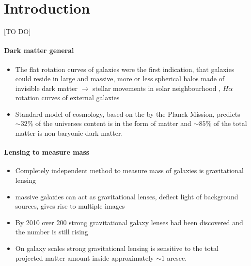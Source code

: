 \section{Introduction}

[TO DO]

\paragraph{Dark matter general}
\begin{itemize}
\item The flat rotation curves of galaxies were the first indication, that galaxies could reside in large and massive, more or less spherical halos made of invisible dark matter $\longrightarrow$ stellar movements in solar neighbourhood \citep{1932BAN.....6..249O}, $H\alpha$ rotation curves of external galaxies \citep{1978ApJ...225L.107R}
\item Standard model of cosmology, based on the by the Planck Mission, predicts $\sim32\%$ of the universes content is in the form of matter and $\sim 85\%$ of the total matter is non-baryonic dark matter.
\end{itemize}

\paragraph{Lensing to measure mass}
\begin{itemize}
\item Completely independent method to measure mass of galaxies is gravitational lensing
\item massive galaxies can act as gravitational lenses, deflect light of background sources, gives rise to multiple images
\item By 2010 over 200 strong gravitational galaxy lenses had been discovered \citep{2010ARA&A..48...87T} and the number is still rising
\item On galaxy scales strong gravitational lensing is sensitive to the total projected matter amount inside approximately $\sim 1$ arcsec.
\end{itemize}

